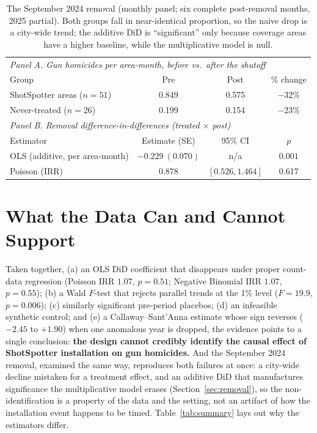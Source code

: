 \documentclass[12pt]{article}
\begin{document}
\begin{table}[H]
\centering
\small
\caption{The September 2024 removal (monthly panel; six complete post-removal months,
2025 partial). Both groups fall in near-identical proportion, so the naive drop is a
city-wide trend; the additive DiD is ``significant'' only because coverage areas have a
higher baseline, while the multiplicative model is null.}
\label{tab:removal}
\begin{tabular}{lccc}
\toprule
\multicolumn{4}{l}{\emph{Panel A. Gun homicides per area-month, before vs.\ after the shutoff}} \\
Group & Pre & Post & \% change \\
\midrule
ShotSpotter areas ($n=51$) & 0.849 & 0.575 & $-32\%$ \\
Never-treated ($n=26$)     & 0.199 & 0.154 & $-23\%$ \\
\midrule
\multicolumn{4}{l}{\emph{Panel B. Removal difference-in-differences (treated $\times$ post)}} \\
Estimator & Estimate (SE) & 95\% CI & $p$ \\
\midrule
OLS (additive, per area-month) & $-0.229\ (0.070)$ & n/a & $0.001$ \\
Poisson (IRR)                  & $0.878$ & $[0.526, 1.464]$ & 0.617 \\
\bottomrule
\end{tabular}
\end{table}

\section{What the Data Can and Cannot Support}

Taken together, (a) an OLS DiD coefficient that disappears under proper count-data
regression (Poisson IRR $1.07$, $p = 0.51$; Negative Binomial IRR $1.07$, $p = 0.55$);
(b) a Wald $F$-test that rejects parallel trends at the 1\% level ($F = 19.9$, $p =
0.006$); (c) similarly significant pre-period placebos; (d) an infeasible synthetic
control; and (e) a Callaway--Sant'Anna estimate whose sign reverses ($-2.45$ to $+1.90$)
when one anomalous year is dropped, the evidence points to a single conclusion: \textbf{the
design cannot credibly identify the causal effect of ShotSpotter installation on gun
homicides.} And the September 2024 removal, examined the same way, reproduces both
failures at once: a city-wide decline mistaken for a treatment effect, and an additive DiD
that manufactures significance the multiplicative model erases (Section~\ref{sec:removal}), so
the non-identification is a property of the data and the setting, not an artifact of how the
installation event happens to be timed. Table~\ref{tab:summary} lays out why the estimators
differ.
\end{document}
